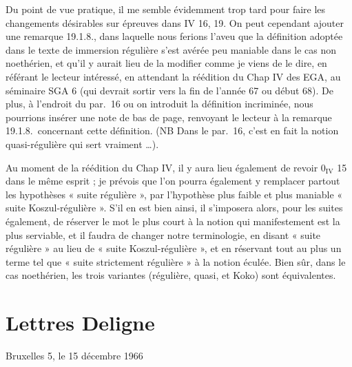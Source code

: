 \documentclass[11pt,a4paper]{article}
\begin{document}
Du point de vue pratique, il me semble évidemment trop tard pour faire les
changements désirables sur épreuves dans IV 16, 19. On peut cependant ajouter
une remarque 19.1.8., dans laquelle nous ferions l'aveu que  la
définition adoptée dans le texte de immersion régulière s'est
 avérée peu maniable dans le cas non noethérien, et qu'il y aurait
lieu de la modifier comme je viens de le dire, en référant le lecteur
intéressé,  en attendant la réédition du Chap IV des
EGA, au séminaire SGA 6 (qui devrait sortir vers la fin de l'année 67 ou
début 68). De plus, à l'endroit du par.\ 16 ou on introduit la définition
incriminée, nous pourrions insérer une note de bas de page, renvoyant le
lecteur à la remarque 19.1.8.\ concernant cette définition. (NB Dans le
par.\ 16, c'est en fait la notion quasi-régulière qui sert vraiment \ldots).

Au moment de la réédition du Chap IV, il y aura lieu également de revoir
$0_{\mathrm{IV}}$ 15 dans le même esprit ; je prévois que l'on pourra
également y remplacer partout les hypothèses « suite régulière », par
l'hypothèse plus faible et plus maniable « suite Koszul-régulière ». S'il en
est bien ainsi, il s'imposera alors, pour les suites également, de réserver
le mot le plus court à la notion qui manifestement est la plus serviable, et
il faudra  de changer \struck{\ill{}} notre
terminologie, en disant « suite régulière » au lieu de « suite
Koszul-régulière », et en réservant tout au plus un terme tel que « suite
strictement régulière » à la notion éculée. Bien sûr, dans le cas
noethérien, les trois variantes (régulière, quasi, et Koko) sont
équivalentes.

\section{Lettres Deligne}


Bruxelles 5, le 15 décembre 1966
\end{document}
